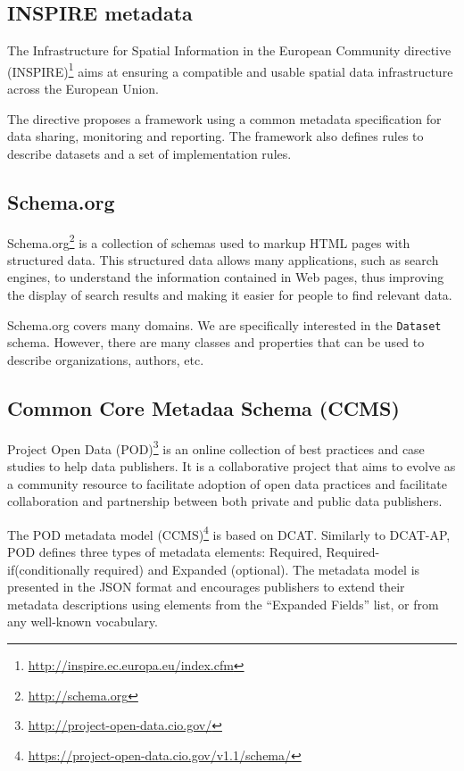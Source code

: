 \subsection{INSPIRE metadata}
The Infrastructure for Spatial Information in the European Community directive (INSPIRE)\footnote{\url{http://inspire.ec.europa.eu/index.cfm}} aims at ensuring a compatible and usable spatial data infrastructure across the European Union.

The directive proposes a framework using a common metadata specification for data sharing, monitoring and reporting. The framework also defines rules to describe datasets and a set of implementation rules.

\subsection{Schema.org}
Schema.org\footnote{\url{http://schema.org}} is a collection of schemas used to markup HTML pages with structured data. This structured data allows many applications, such as search engines, to understand the information contained in Web pages, thus improving the display of search results and making it easier for people to find relevant data.

Schema.org covers many domains. We are specifically interested in the \texttt{Dataset} schema. However, there are many classes and properties that can be used to describe organizations, authors, etc.

\subsection{Common Core Metadaa Schema (CCMS)}
Project Open Data (POD)\footnote{\url{http://project-open-data.cio.gov/}} is an online collection of best practices and case studies to help data publishers. It is a collaborative project that aims to evolve as a community resource to facilitate adoption of open data practices and facilitate collaboration and partnership between both private and public data publishers.

The POD metadata model (CCMS)\footnote{\url{https://project-open-data.cio.gov/v1.1/schema/}} is based on DCAT. Similarly to DCAT-AP, POD defines three types of metadata elements: Required, Required-if(conditionally required) and Expanded (optional). The metadata model is presented in the JSON format and encourages publishers to extend their metadata descriptions using elements from the ``Expanded Fields'' list, or from any well-known vocabulary.

